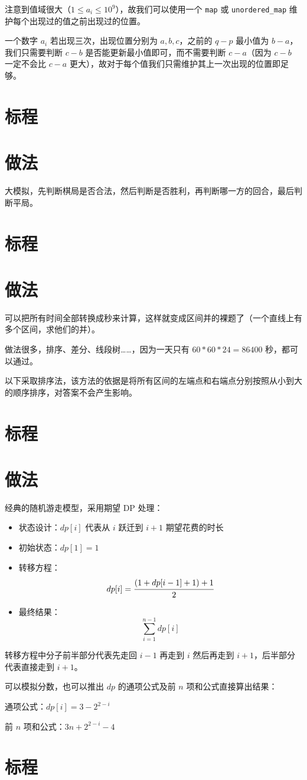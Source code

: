 \documentclass{../cpct/ctsol}
\begin{document}
注意到值域很大（$1 \leq a_i \leq {10}^9$），故我们可以使用一个 \lstinline{map} 或 \lstinline{unordered_map} 维护每个出现过的值之前出现过的位置。

一个数字 $a_i$ 若出现三次，出现位置分别为 $a,b,c$，之前的 $q-p$ 最小值为 $b-a$，我们只需要判断 $c-b$ 是否能更新最小值即可，而不需要判断 $c-a$（因为 $c-b$ 一定不会比 $c-a$ 更大），故对于每个值我们只需维护其上一次出现的位置即足够。

\section*{标程}


\makesolution
\section*{做法}

大模拟，先判断棋局是否合法，然后判断是否胜利，再判断哪一方的回合，最后判断平局。

\section*{标程}


\makesolution
\section*{做法}

可以把所有时间全部转换成秒来计算，这样就变成区间并的裸题了（一个直线上有多个区间，求他们的并）。

做法很多，排序、差分、线段树……，因为一天只有 $60*60*24=86400$ 秒，都可以通过。

以下采取排序法，该方法的依据是将所有区间的左端点和右端点分别按照从小到大的顺序排序，对答案不会产生影响。

\section*{标程}


\makesolution
\section*{做法}

经典的随机游走模型，采用期望 DP 处理：

\begin{itemize}
    \item 状态设计：$dp[i]$ 代表从 $i$ 跃迁到 $i+1$ 期望花费的时长
    \item 初始状态：$dp[1] = 1$
    \item 转移方程：$$dp[i] = \cfrac{(1+dp[i-1]+1)+1}{2}$$
    \item 最终结果：$$\sum\limits_{i=1}^{n-1} dp[i]$$
\end{itemize}

转移方程中分子前半部分代表先走回 $i-1$ 再走到 $i$ 然后再走到 $i+1$，后半部分代表直接走到 $i+1$。

可以模拟分数，也可以推出 $dp$ 的通项公式及前 $n$ 项和公式直接算出结果：

通项公式：$dp[i] = 3-2^{2-i}$

前 $n$ 项和公式：$3n+2^{2-i}-4$

\section*{标程}

\end{document}
